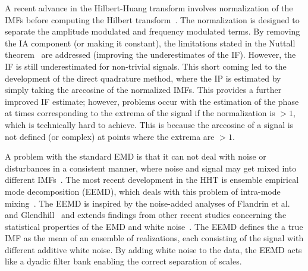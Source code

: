 \documentclass[journal,11pt,a4paper,onecolumn,draftcls]{IEEEtran}
\begin{document}
A recent advance in the Hilbert-Huang transform involves normalization of the IMFs before computing the Hilbert transform~\cite{Huang2005}. The normalization is designed to separate the amplitude modulated and frequency modulated terms. By removing the IA component (or making it constant), the limitations stated in the Nuttall theorem~\cite{Nuttall1966} are addressed (improving the underestimates of the IF). However, the IF is still underestimated for non-trivial signals. This short coming led to the development of the direct quadrature method, where the IP is estimated by simply taking the arccosine of the normalized IMFs. This provides a further improved IF estimate; however, problems occur with the estimation of the phase at times corresponding to the extrema of the signal if the normalization is $>1$, which is technically hard to achieve. This is because the arccosine of a signal is not defined (or complex) at points where the extrema are $>1$. 

A problem with the standard EMD is that it can not deal with noise or disturbances in a consistent manner, where noise and signal may get mixed into different IMFs~\cite{Wu2009}. The most recent development in the HHT is ensemble empirical mode decomposition (EEMD), which deals with this problem of intra-mode mixing~\cite{Wu2009}. The EEMD is inspired by the noise-added analyses of Flandrin et al.~\cite{Flandrin2005} and Glendhill~\cite{Gledhill2003} and extends findings from other recent studies concerning the statistical properties of the EMD and white noise~\cite{Flandrin2004,Wu2004}. The EEMD defines the a true IMF as the mean of an ensemble of realizations, each consisting of the signal with different additive white noise. By adding white noise to the data, the EEMD acts like a dyadic filter bank enabling the correct separation of scales.
\end{document}
